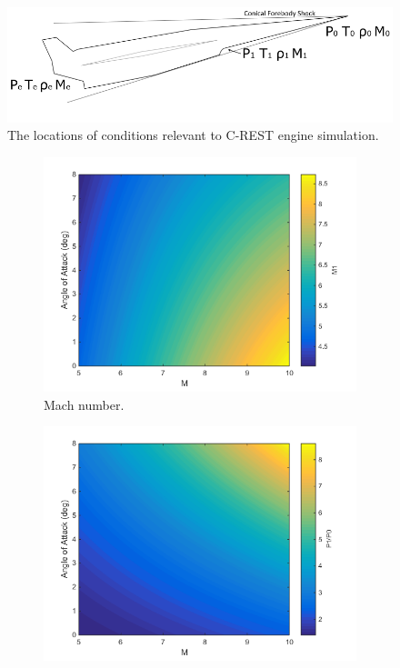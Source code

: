 

\begin{figure}[ht]
	\centering
	\includegraphics[width=0.7\linewidth]{figures/3_vehicle_design/SPARTANEngineshock}
	\caption{The locations of conditions relevant to C-REST engine simulation. }
	\label{fig:SPARTANEngineshock}
\end{figure}

\begin{figure}[ht]
	\begin{subfigure}{.5\textwidth}
		\centering
		\includegraphics[width=0.99\linewidth]{figures/3_vehicle_design/ConicalM}
		\caption{Mach number.}
		\label{fig:ConicalM}
	\end{subfigure}
	\begin{subfigure}{.5\textwidth}
		\centering
		\includegraphics[width=0.99\linewidth]{figures/3_vehicle_design/ConicalP}

\end{subfigure}
\end{figure}
